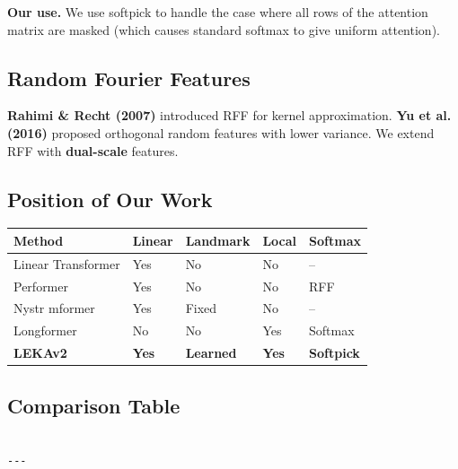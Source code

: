 \textbf{Our use.} We use softpick to handle the case where all rows of the 
attention matrix are masked (which causes standard softmax to give 
uniform attention).

\subsection{Random Fourier Features}

\textbf{Rahimi \& Recht (2007)} introduced RFF for kernel approximation. 
\textbf{Yu et al. (2016)} proposed orthogonal random features with lower 
variance. We extend RFF with \textbf{dual-scale} features.

\subsection{Position of Our Work}

\begin{table}[H]
\centering
\small
\begin{tabular}{lllll}
\toprule
\textbf{Method} & \textbf{Linear} & \textbf{Landmark} & \textbf{Local} & \textbf{Softmax} \\
\midrule
Linear Transformer & Yes & No & No & -- \\
Performer & Yes & No & No & RFF \\
Nystr mformer & Yes & Fixed & No & -- \\
Longformer & No & No & Yes & Softmax \\
\textbf{LEKAv2} & \textbf{Yes} & \textbf{Learned} & \textbf{Yes} & \textbf{Softpick} \\
\bottomrule
\end{tabular}
\end{table}



\subsection{Comparison Table}

\begin{lstlisting}

---
\end{lstlisting}